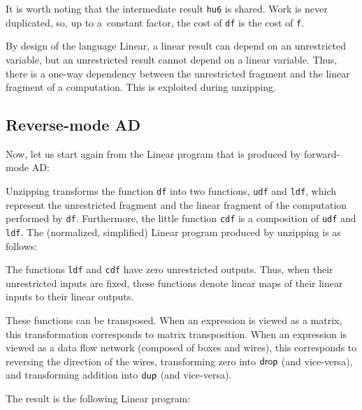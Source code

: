 \documentclass{article}
\begin{document}
It is worth noting that the intermediate result \texttt{hu6} is shared. Work
is never duplicated, so, up to a~constant factor, the cost of \texttt{df} is
the cost of \texttt{f}.

By design of the language Linear, a linear result can depend on an
unrestricted variable, but an unrestricted result cannot depend on a linear
variable. Thus, there is a one-way dependency between the unrestricted
fragment and the linear fragment of a computation. This is exploited during
unzipping.

\subsection{Reverse-mode AD}
\label{sec:example:rmad}

Now, let us start again from the Linear program that is produced by
forward-mode AD:

\begin{mdframed}[backgroundcolor=gray!10,linewidth=0pt]

\end{mdframed}

Unzipping transforms the function \texttt{df} into two functions, \texttt{udf}
and \texttt{ldf}, which represent the unrestricted fragment and the linear
fragment of the computation performed by \texttt{df}. Furthermore, the little
function \texttt{cdf} is a composition of \texttt{udf} and \texttt{ldf}. The
(normalized, simplified) Linear program produced by unzipping is as follows:

\begin{mdframed}[backgroundcolor=gray!10,linewidth=0pt]

\end{mdframed}

The functions \texttt{ldf} and \texttt{cdf} have zero unrestricted outputs.
Thus, when their unrestricted inputs are fixed, these functions denote linear
maps of their linear inputs to their linear outputs.

These functions can be transposed. When an expression is viewed as a matrix,
this transformation corresponds to matrix transposition. When an expression is
viewed as a data flow network (composed of boxes and wires), this corresponds
to reversing the direction of the wires, transforming zero into
$\mathsf{drop}$ (and vice-versa), and transforming addition into
$\mathsf{dup}$ (and vice-versa).

The result is the following Linear program:
\end{document}
